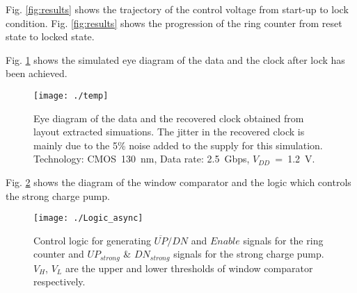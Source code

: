 \documentclass[journal,twoside,letterpaper]{IEEEtran}
\begin{document}
Fig. \ref{fig:results} shows the trajectory of the control voltage
from start-up to lock condition.
Fig. \ref{fig:results} shows the progression of the ring counter
from reset state to locked state.
\begin{figure*}[h]
\centering
{}
\hspace{5ex}
\caption{Signals of the synchronizer obtained from 
layout extracted simulations.}
\label{fig:results}
\end{figure*}
Fig. \ref{fig:eye} shows the simulated eye diagram
of the data and the clock after lock has been achieved.
\begin{figure}[h]
\centering
{}

\texttt{[image: ./temp]}
\caption{Eye diagram of the data and the recovered clock 
obtained from layout extracted simuations. The jitter in the recovered clock 
is mainly due to the 5\% noise added to the supply for this simulation. 
Technology: \mbox{CMOS 130 nm}, 
Data rate: \mbox{2.5 Gbps}, \mbox{$V_{DD}$ = 1.2 V}.}
\label{fig:eye}
\end{figure}
Fig. \ref{fig:logic} shows the diagram of the window comparator
and the logic which controls the strong charge pump.
\begin{figure}[h!]
\centering
\texttt{[image: ./Logic\_async]}
\caption{Control logic for generating $\overline{UP}/DN$
and $Enable$ signals for the ring counter and $UP_{strong}$ \& $DN_{strong}$ signals
for the strong charge pump. $V_H$, $V_L$ are the 
upper and lower thresholds of window comparator respectively.}
\label{fig:logic}
\end{figure}
\end{document}

